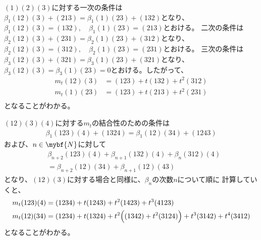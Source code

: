 	$(1)(2)(3)$に対する一次の条件は
	$\beta_1(12)(3) + (213)=\beta_1(1)(23) + (132)$となり、
	$\beta_1(12)(3) = (132),\quad \beta_1(1)(23) = (213)$とおける。 
	二次の条件は$\beta_2(12)(3)+(231)=\beta_2(1)(23)+(312)$となり、
	$\beta_2(12)(3)=(312),\quad\beta_2(1)(23)=(231)$とおける。
	三次の条件は$\beta_3(12)(3)+(321)= \beta_3(1)(23)+(321)$となり、
	$\beta_3(12)(3)=\beta_3(1)(23)=0$とおける。したがって、
	\begin{equation*}\begin{split} %
		m_t(12)(3) &= (123) + t(132) + t^2(312) \\
		m_t(1)(23) &= (123) + t(213) + t^2(231) \\
	\end{split}\end{equation*} %
	となることがわかる。

	$(12)(3)(4)$に対する$m_t$の結合性のための条件は
	\begin{equation*}\begin{split} %
		\beta_1(123)(4)+(1324)=\beta_1(12)(34)+(1243)
	\end{split}\end{equation*} %
	および、$n\in\mybf{N}$に対して
	\begin{equation*}\begin{split} %
		&\beta_{n+2}(123)(4) +\beta_{n+1}(132)(4) +\beta_{n}(312)(4) \\
		&= \beta_{n+2}(12)(34)+\beta_{n+1}(12)(43)
	\end{split}\end{equation*} %
	となり、$(12)(3)$に対する場合と同様に、$\beta_n$の次数$n$について順に
	計算していくと、
	\begin{equation*}\begin{split} %
		m_t(123)(4) &= (1234)+ t(1243)+ t^2(1423)+ t^3(4123) \\
		m_t(12)(34) &= (1234)+ t(1324)+ t^2\Bigl((1342)+ t^2(3124)\Bigr)
		+ t^3(3142)+ t^4(3412)
	\end{split}\end{equation*} %
	となることがわかる。

